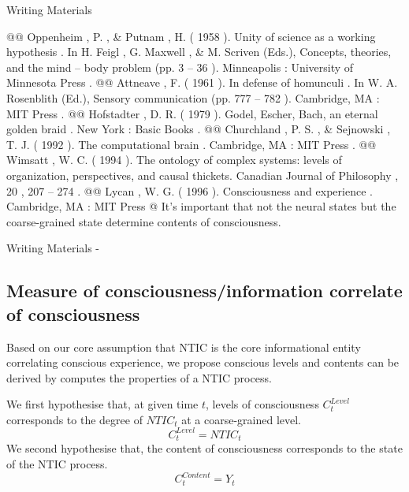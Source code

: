 \documentclass[utf8]{article}
\newenvironment{WritingMaterials} %
    	{
            \begin{tcolorbox}[enhanced,
                title=-,
                size=small,
                colbacktitle=Aquamarine,
                drop fuzzy shadow,
                fontupper=\small,
                boxrule=0.4pt,
                colback=Aquamarine!10!white,
                sharp corners]
                Writing Materials
            \end{tcolorbox}
            \begin{easylist}[itemize]
    	}
    	{
            \end{easylist}  
            \begin{tcolorbox}[enhanced,
                halign=flush right,
                halign title=right,
                size=small,
                colbacktitle=Aquamarine,
                drop fuzzy shadow,
                fontupper=\small,
                boxrule=0.4pt,
                colback=Aquamarine,
                colupper=White,
                sharp corners]
                Writing Materials -
            \end{tcolorbox}        
    	}
\newcommand{\rlstart}[1]{  %
        \setlength\changebarwidth{#1pt*2}  %
        \hspace*{-40pt}
        \cbstart{\textcolor{red}{\newline\textbf{iteration #1}}\newline}}
\newcommand{\rlend}{\cbend}
\begin{document}
\begin{WritingMaterials}
				@@ Oppenheim , P. , \& Putnam , H. ( 1958 ). Unity of science as a working hypothesis . In H. Feigl , G. Maxwell , \& M. Scriven (Eds.), Concepts, theories, and the mind – body problem (pp. 3 – 36 ). Minneapolis : University of Minnesota Press .
				@@ Attneave , F. ( 1961 ). In defense of homunculi . In W. A. Rosenblith (Ed.), Sensory communication (pp. 777 – 782 ). Cambridge, MA : MIT Press .
				@@ Hofstadter , D. R. ( 1979 ). Godel, Escher, Bach, an eternal golden braid . New York : Basic Books .
				@@ Churchland , P. S. , \& Sejnowski , T. J. ( 1992 ). The computational brain . Cambridge, MA : MIT Press .
				@@ Wimsatt , W. C. ( 1994 ). The ontology of complex systems: levels of organization, perspectives, and causal thickets. Canadian Journal of Philosophy , 20 , 207 – 274 .
				@@ Lycan ,  W. G.  ( 1996 ).  Consciousness and experience .  Cambridge, MA :  MIT Press
			@ It's important that not the neural states but the coarse-grained state determine contents of consciousness.

        

		\end{WritingMaterials}


\rlend







\rlstart{3}
		\subsection{Measure of consciousness/information correlate of consciousness}	
		Based on our core assumption that NTIC is the core informational entity correlating conscious experience, we propose conscious levels and contents can be derived by computes the properties of a NTIC process. \newline
		
		\noindent
		We first hypothesise that, at given time $t$, levels of consciousness $C_{t}^{Level}$ corresponds to the degree of  $NTIC_{t}$ at a coarse-grained level.
			\begin{equation}\label{eq:cLevel}
				C_{t}^{Level} = NTIC_{t}
			\end{equation}
		\newline
		\noindent
		We second hypothesise that, the content of consciousness corresponds to the state of the NTIC process.
			\begin{equation}\label{eq:cContent}
				C_{t}^{Content} = Y_{t}
			\end{equation}
		
\end{document}
